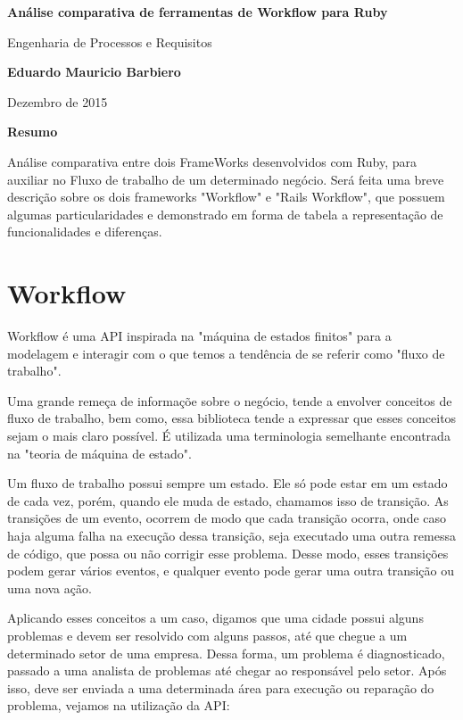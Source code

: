 \documentclass[12pt, letterpaper]{article}
\begin{document}
\begin{center}
    \Large
    \textbf{Análise comparativa de ferramentas de Workflow para Ruby}
    
    \vspace{0.4cm}
    \large
    Engenharia de Processos e Requisitos
    
    \vspace{0.4cm}
    \textbf{Eduardo Mauricio Barbiero}
    
    \vspace{0.4cm}
    {Dezembro de 2015}
    
    \vspace{0.9cm}
    \textbf{Resumo}
\end{center}

\par
Análise comparativa entre dois FrameWorks desenvolvidos com Ruby, para auxiliar no Fluxo de trabalho de um determinado negócio. Será feita uma breve descrição sobre os dois frameworks "Workflow" e "Rails Workflow", que possuem algumas particularidades e demonstrado em forma de tabela a representação de funcionalidades e diferenças. 

\section{Workflow}

Workflow é uma API inspirada na "máquina de estados finitos" para a modelagem e interagir com o que temos a tendência de se referir como "fluxo de trabalho".

Uma grande remeça de informaçõe sobre o negócio, tende a envolver conceitos de fluxo de trabalho, bem como, essa biblioteca tende a expressar que esses conceitos sejam o mais claro possível. É utilizada uma terminologia semelhante encontrada na "teoria de máquina de estado".

Um fluxo de trabalho possui sempre um estado. Ele só pode estar em um estado de cada vez, porém, quando ele muda de estado, chamamos isso de transição. As transições de um evento, ocorrem de modo que cada transição ocorra, onde caso haja alguma falha na execução dessa transição, seja executado uma outra remessa de código, que possa ou não corrigir esse problema. Desse modo, esses transições podem gerar vários eventos, e qualquer evento pode gerar uma outra transição ou uma nova ação.

Aplicando esses conceitos a um caso, digamos que uma cidade possui alguns problemas e devem ser resolvido com alguns passos, até que chegue a um determinado setor de uma empresa. Dessa forma, um problema é diagnosticado, passado a uma analista de problemas até chegar ao responsável pelo setor. Após isso, deve ser enviada a uma determinada área para execução ou reparação do problema, vejamos na utilização da API:
\end{document}
